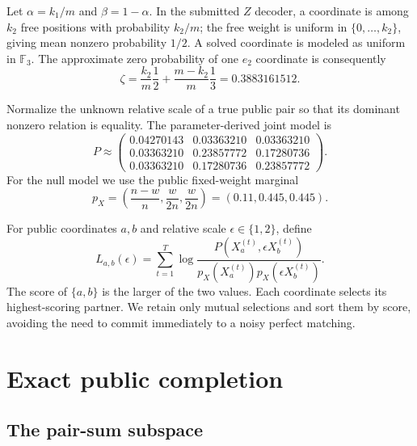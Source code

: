 \documentclass[11pt,a4paper]{article}
\newcommand{\F}{\mathbb{F}}
\begin{document}
Let $\alpha=k_1/m$ and $\beta=1-\alpha$.  In the submitted $Z$ decoder, a
coordinate is among $k_2$ free positions with probability $k_2/m$; the free
weight is uniform in $\{0,\ldots,k_2\}$, giving mean nonzero probability
$1/2$.  A solved coordinate is modeled as uniform in $\F_3$.  The approximate
zero probability of one $e_2$ coordinate is consequently
\begin{equation}
 \zeta=\frac{k_2}{m}\frac12+
       \frac{m-k_2}{m}\frac13
       =0.3883161512.
 \label{eq:zeta}
\end{equation}

Normalize the unknown relative scale of a true public pair so that its
dominant nonzero relation is equality.  The parameter-derived joint model is
\begin{equation}
 P\approx
 \begin{pmatrix}
  0.04270143&0.03363210&0.03363210\\
  0.03363210&0.23857772&0.17280736\\
  0.03363210&0.17280736&0.23857772
 \end{pmatrix}.
 \label{eq:model}
\end{equation}
For the null model we use the public fixed-weight marginal
\[
          p_X=\left(\frac{n-w}{n},
                    \frac{w}{2n},\frac{w}{2n}\right)
              =(0.11,0.445,0.445).
\]

For public coordinates $a,b$ and relative scale
$\epsilon\in\{1,2\}$, define
\begin{equation}
 L_{a,b}(\epsilon)=
 \sum_{t=1}^{T}
 \log\frac{P(X_a^{(t)},\epsilon X_b^{(t)})}
               {p_X(X_a^{(t)})p_X(\epsilon X_b^{(t)})}.
 \label{eq:llr}
\end{equation}
The score of $\{a,b\}$ is the larger of the two values.  Each coordinate
selects its highest-scoring partner.  We retain only mutual selections and
sort them by score, avoiding the need to commit immediately to a noisy
perfect matching.

\section{Exact public completion}

\subsection{The pair-sum subspace}
\end{document}
